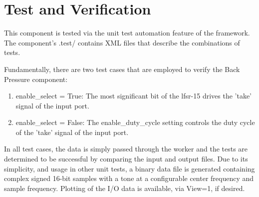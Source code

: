\documentclass{article}
\begin{document}
\section*{Test and Verification}
\begin{flushleft}
This component is tested via the unit test automation feature of the framework.  The component's .test/ contains XML files that describe the combinations of tests. \medskip

Fundamentally, there are two test cases that are employed to verify the Back Pressure component:

\begin{enumerate}
	\item enable\_select = True: The most significant bit of the lfsr-15 drives the 'take' signal of the input port.
	\item enable\_select = False: The enable\_duty\_cycle setting controls the duty cycle of the 'take' signal of the input port.
\end{enumerate}

	In all test cases, the data is simply passed through the worker and the tests are determined to be successful by comparing the input and output files. Due to its simplicity, and usage in other unit tests, a binary data file is generated containing complex signed 16-bit samples with a tone at a configurable center frequency and sample frequency. Plotting of the I/O data is available, via View=1, if desired.
\end{flushleft}
\end{document}
